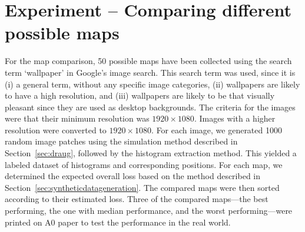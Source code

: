 \section{Experiment -- Comparing different possible maps}

For the map comparison, 50 possible maps have been collected using the
search term `wallpaper' in Google's image search. This search term was
used, since it is (i) a general term, without any specific image
categories, (ii) wallpapers are likely to have a high resolution, and
(iii) wallpapers are likely to be that visually pleasant since they
are used as desktop backgrounds. The criteria for the images were that
their minimum resolution was $1920 \times 1080$. Images with a higher
resolution were converted to $1920 \times 1080$.  For each image, we
generated 1000 random image patches using the simulation method
described in Section~\ref{sec:draug}, followed by the histogram
extraction method. This yielded a labeled dataset of histograms and
corresponding positions. For each map, we determined the expected
overall loss based on the method described in
Section~\ref{sec:syntheticdatageneration}. The compared maps were then sorted
according to their estimated loss. Three of the compared maps---the
best performing, the one with median performance, and the worst
performing---were printed on A0 paper to test the performance in the
real world.

